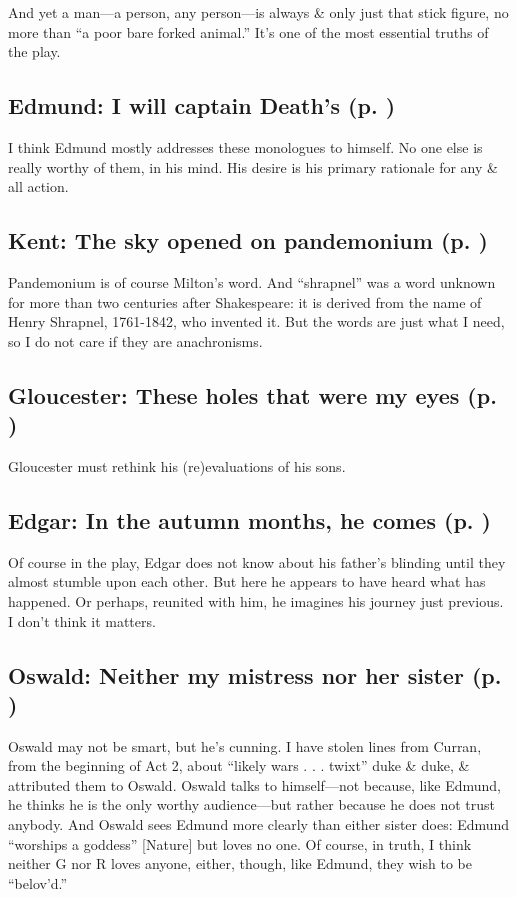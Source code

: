 And yet a man---a person, any person---is always \& only just that stick figure, no more than ``a poor bare forked animal.'' It's one of the most essential truths of the play.

\subsection*{Edmund: I will captain Death's (p. \pageref{ch:lear_bb})}
I think Edmund mostly addresses these monologues to himself. No one else is really worthy of them, in his mind. His desire is his primary rationale for any \& all action.

\subsection*{Kent: The sky opened on pandemonium (p. \pageref{ch:lear_bc})}
Pandemonium is of course Milton's word. And ``shrapnel'' was a word unknown for more than two centuries after Shakespeare: it is derived from the name of Henry Shrapnel, 1761-1842, who invented it. But the words are just what I need, so I do not care if they are anachronisms.

\subsection*{Gloucester: These holes that were my eyes (p. \pageref{ch:lear_bd})}
Gloucester must rethink his (re)evaluations of his sons.

\subsection*{Edgar: In the autumn months, he comes (p. \pageref{ch:lear_be})}
Of course in the play, Edgar does not know about his father's blinding until they almost stumble upon each other. But here he appears to have heard what has happened. Or perhaps, reunited with him, he imagines his journey just previous. I don't think it matters.

\subsection*{Oswald: Neither my mistress nor her sister (p. \pageref{ch:lear_bf})}
Oswald may not be smart, but he's cunning. I have stolen lines from Curran, from the beginning of Act 2, about ``likely wars . . . twixt'' duke \& duke, \& attributed them to Oswald. Oswald talks to himself---not because, like Edmund, he thinks he is the only worthy audience---but rather because he does not trust anybody. And Oswald sees Edmund more clearly than either sister does: Edmund ``worships a goddess'' {[}Nature{]} but loves no one. Of course, in truth, I think neither G nor R loves anyone, either, though, like Edmund, they wish to be ``belov'd.''

